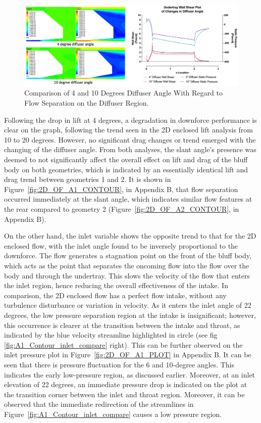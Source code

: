\begin{figure}[!htb]
    \centering
    \includegraphics[scale=0.52]{Figures/2D_OF/10_4_O_COMPARE CONTOUR.PNG}
    \caption{Comparison of 4 and 10 Degrees Diffuser Angle With Regard to Flow Separation on the Diffuser Region.}
    \label{fig:2D_OF_10_4_Contour_compare}
\end{figure}

\noindent Following the drop in lift at 4 degrees, a degradation in downforce performance is clear on the graph, following the trend seen in the 2D enclosed lift analysis from 10 to 20 degrees. However, no significant drag changes or trend emerged with the changing of the diffuser angle. From both analyses, the slant angle's presence was deemed to not significantly affect the overall effect on lift and drag of the bluff body on both geometries, which is indicated by an essentially identical lift and drag trend between geometries 1 and 2. It is shown in Figure~\ref{fig:2D_OF_A1_CONTOUR}, in Appendix B, that flow separation occurred immediately at the slant angle, which indicates similar flow features at the rear compared to geometry 2 (Figure~\ref{fig:2D_OF_A2_CONTOUR}, in Appendix B). 

\noindent On the other hand, the inlet variable shows the opposite  trend to that for the 2D enclosed flow, with the inlet angle found to be inversely proportional to the downforce. The flow generates a stagnation point on the front of the bluff body, which acts as the point that separates the oncoming flow into the flow over the body and through the undertray. This slows the velocity of the flow that enters the inlet region, hence reducing the overall effectiveness of the intake. In comparison, the 2D enclosed flow has a perfect flow intake, without any turbulence disturbance or variation in velocity. As it enters the inlet angle of 22 degrees, the low pressure separation region at the intake is insignificant; however, this occurrence is clearer at the transition between the intake and throat, as indicated by the blue velocity streamline highlighted in circle (see fig \ref{fig:A1_Contour_inlet_compare} right). This can be further observed on the inlet pressure plot in Figure~\ref{fig:2D_OF_A1_PLOT} in Appendix B. It can be seen that there is pressure fluctuation for the 6 and 10-degree angles. This indicates the early low-pressure region, as discussed earlier. Moreover, at an inlet elevation of 22 degrees, an immediate pressure drop is indicated on the plot at the transition corner between the inlet and throat region. Moreover, it can be observed that the immediate redirection of the streamlines in Figure~\ref{fig:A1_Contour_inlet_compare} causes a low pressure region.

